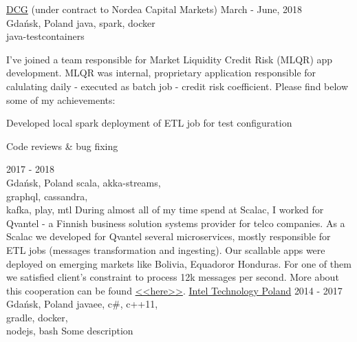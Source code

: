 \documentclass[a4paper,11pt]{cv4tw}%
\begin{document}
      {\href{https://diversecg.pl/}{DCG} (under contract to Nordea Capital Markets)}
      {March - June, 2018\\Gdańsk, Poland}
	  {java, spark, docker\\java-testcontainers}
	  {I've joined a team responsible for Market Liquidity Credit Risk (MLQR) app development. MLQR was internal, proprietary application responsible for calulating daily - executed as batch job - credit risk coefficient. Please find below some of my achievements:
	    \begin{missions}
		\item Developed local spark deployment of ETL job for test configuration
        \item Code reviews \& bug fixing
	    \end{missions}
      }
      {2017 - 2018\\Gdańsk, Poland}
	  {scala, akka-streams,\\graphql, cassandra,\\kafka, play, mtl}
	  {During almost all of my time spend at Scalac, I worked for Qvantel - a Finnish business solution systems provider for telco companies. As a Scalac we developed for Qvantel several microservices, mostly responsible for ETL jobs (messages transformation and ingesting). Our scallable apps were deployed on emerging markets like Bolivia, Equadoror Honduras. For one of them we satisfied client's constraint to process \approx12k messages per second. More about this cooperation can be found \href{http://media.licdn.com/embeds/media.html?src=https\%3A\%2F\%2Fissuu.com\%2Foutlookpublishing\%2Fdocs\%2Fqvantel\&amp;url=https\%3A\%2F\%2Fissuu.com\%2Foutlookpublishing\%2Fdocs\%2Fqvantel\&amp;type=text\%2Fhtml\&amp;schema=issuu}{<<here>>}.
      }
      {\href{https://www.intel.com/content/www/us/en/jobs/locations/poland.html}
        {Intel Technology Poland}}
      {2014 - 2017\\Gdańsk, Poland}
	  {javaee, c\#, c++11,\\gradle, docker,\\nodejs, bash}
	  {Some description}
\end{document}
